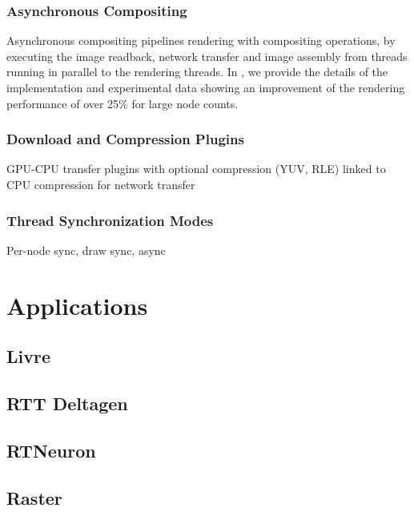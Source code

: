 \documentclass[10pt,journal,compsoc]{IEEEtran}
\begin{document}
\subsubsection{Asynchronous Compositing}

Asynchronous compositing pipelines rendering with compositing operations, by
executing the image readback, network transfer and image assembly from threads
running in parallel to the rendering threads. In \cite{EBAHMP:12}, we provide
the details of the implementation and experimental data showing an improvement
of the rendering performance of over 25\% for large node counts.

\subsubsection{Download and Compression Plugins}

GPU-CPU transfer plugins with optional compression (YUV, RLE) linked to CPU
compression for network transfer \cite{MEP:10}

\subsubsection{Thread Synchronization Modes}\label{SEC_threading}

Per-node sync, draw sync, async

\section{Applications}

\subsection{Livre}
\subsection{RTT Deltagen}

\subsection{RTNeuron}
\cite{HBBES:13}

\subsection{Raster}
\end{document}
